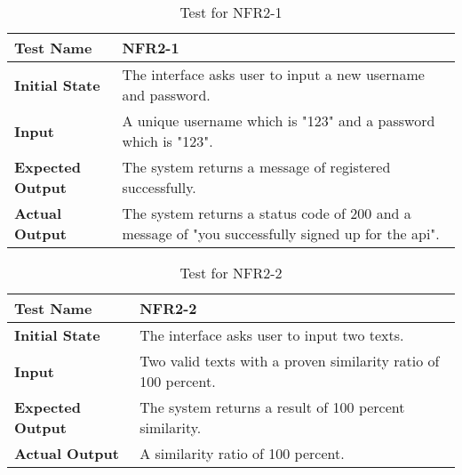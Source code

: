 \documentclass[12pt, titlepage]{article}
\begin{document}
        \begin{table}[H]
			
			\begin{tabular}[r]{|l|p{10cm}|}
				
				\hline
				
				\textbf{Test Name} & NFR2-1 \\ 
				\hline
				\textbf{Initial State} & The interface asks user to input a new username and password.\\ 
				\hline
				\textbf{Input} & A unique username which is "123" and a password which is "123". \\ 
				\hline 
				\textbf{Expected Output} & The system returns a message of registered successfully.  \\ 
				\hline
				\textbf{Actual Output} & The system returns a status code of 200 and a message of "you successfully signed up for the api".  \\ 
				\hline
				
			\end{tabular}
			\caption{Test for NFR2-1}
			\label{Table}
		\end{table}

        \begin{table}[H]
			
			\begin{tabular}[r]{|l|p{10cm}|}
				
				\hline
				
				\textbf{Test Name} & NFR2-2 \\ 
				\hline
				\textbf{Initial State} & The interface asks user to input two texts.\\ 
				\hline
				\textbf{Input} & Two valid texts with a proven similarity ratio of 100 percent. \\ 
				\hline 
				\textbf{Expected Output} & The system returns a result of 100 percent similarity.  \\ 
				\hline
				\textbf{Actual Output} & A similarity ratio of 100 percent.  \\ 
				\hline
				
			\end{tabular}
			\caption{Test for NFR2-2}
			\label{Table}
		\end{table}
		
\end{document}
